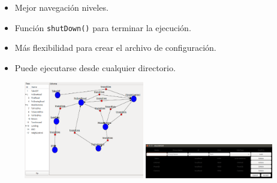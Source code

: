 \documentclass[notes,slidesec,a4]{seminar}
\begin{document}
\begin{hslide}

\begin{minipage}[t]{0.45\textwidth}
\begin{center}
	\begin{itemize}
	\item Mejor navegación niveles.
	\item Función \texttt{shutDown()} para terminar la ejecución.
	\item Más flexibilidad para crear el archivo de configuración.
	\item Puede ejecutarse desde cualquier directorio.
	\end{itemize}
\end{center}
\end{minipage}\hfill
\begin{minipage}[t]{0.45\textwidth}
\begin{center}
	\begin{figure}
		\includegraphics[height=4.25cm]{imgs/editor.png}
		\includegraphics[height=1.5cm]{imgs/configFiles.png}
	\end{figure}
\end{center}
\end{minipage}

\end{hslide}

\end{document}
